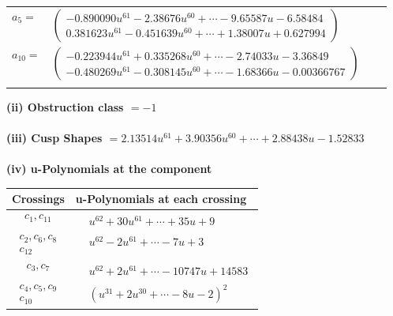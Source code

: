 \documentclass[1p]{elsarticle_modified}
\theoremstyle{definition}
\begin{document}
\begin{tabular}{m{7pt} m{180pt} m{7pt} m{180pt} }
\flushright $a_{5}=$&$\begin{pmatrix}-0.890090 u^{61}-2.38676 u^{60}+\cdots-9.65587 u-6.58484\\0.381623 u^{61}-0.451639 u^{60}+\cdots+1.38007 u+0.627994\end{pmatrix}$ \\
\flushright $a_{10}=$&$\begin{pmatrix}-0.223944 u^{61}+0.335268 u^{60}+\cdots-2.74033 u-3.36849\\-0.480269 u^{61}-0.308145 u^{60}+\cdots-1.68366 u-0.00366767\end{pmatrix}$\\&\end{tabular}
\flushleft \textbf{(ii) Obstruction class $= -1$}\\~\\
\flushleft \textbf{(iii) Cusp Shapes $= 2.13514 u^{61}+3.90356 u^{60}+\cdots+2.88438 u-1.52833$}\\~\\
\newpage\renewcommand{\arraystretch}{1}
\flushleft \textbf{(iv) u-Polynomials at the component}\newline \\
\begin{tabular}{m{50pt}|m{274pt}}
Crossings & \hspace{64pt}u-Polynomials at each crossing \\
\hline $$\begin{aligned}c_{1},c_{11}\end{aligned}$$&$\begin{aligned}
&u^{62}+30 u^{61}+\cdots+35 u+9
\end{aligned}$\\
\hline $$\begin{aligned}c_{2},c_{6},c_{8}\\c_{12}\end{aligned}$$&$\begin{aligned}
&u^{62}-2 u^{61}+\cdots-7 u+3
\end{aligned}$\\
\hline $$\begin{aligned}c_{3},c_{7}\end{aligned}$$&$\begin{aligned}
&u^{62}+2 u^{61}+\cdots-10747 u+14583
\end{aligned}$\\
\hline $$\begin{aligned}c_{4},c_{5},c_{9}\\c_{10}\end{aligned}$$&$\begin{aligned}
&(u^{31}+2 u^{30}+\cdots-8 u-2)^{2}
\end{aligned}$\\
\hline
\end{tabular}\\~\\
\end{document}
